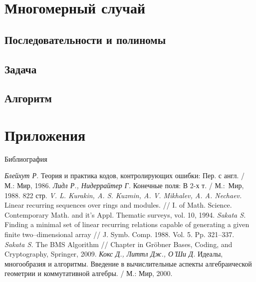 \documentclass[envcountsect,ignorenonframetext,hyperref={pdftex,unicode,urlcolor=blue},
xcolor=dvipsnames]{beamer}
\begin{document}
\section{Многомерный случай}

\subsection{Последовательности и полиномы}

\subsection{Задача}

\subsection{Алгоритм}

\section{Приложения}

\begin{frame}{Библиография} %
    \begin{thebibliography}{9}
    \footnotesize
     \emph{Блейхут Р.} Теория и практика кодов,
    контролирующих ошибки: Пер. с англ. / М.: Мир, 1986.
    \emph{Лидл Р., Нидеррайтер Г.} Конечные поля: В
    2-х т. / М.:~Мир, 1988. 822 стр.
    \emph{V. L. Kurakin, A. S. Kuzmin, A. V. Mikhalev,
    A. A. Nechaev.} Linear recurring sequences over rings and modules. // I. of
    Math. Science. Contemporary Math. and it's Appl. Thematic surveys, vol. 10, 1994.
    \emph{Sakata S.} Finding a minimal set of linear
    recurring relations capable of generating a given finite two–dimensional array // J. Symb. Comp. 1988.
Vol. 5. Pp. 321–337.
    \emph{Sakata S.} The BMS Algorithm // Chapter
    in Gröbner Bases, Coding, and Cryptography, Springer, 2009.
    \emph{Кокс Д., Литтл Дж., О’Ши Д.} Идеалы,
    многообразия и алгоритмы. Введение в вычислительные аспекты алгебраической геометрии и 
    коммутативной алгебры. / М.: Мир, 2000. 
    
    \end{thebibliography}
\end{frame}
\end{document}
